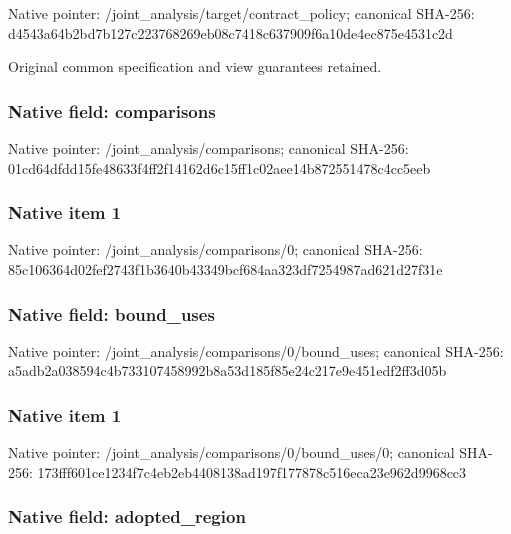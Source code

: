 \documentclass[10pt,a4paper]{article}
\begin{document}
Native pointer: /joint\_analysis/target/contract\_policy; canonical SHA-256: d4543a64b2bd7b127c223768\allowbreak{}269eb08c7418c637909f6a10\allowbreak{}de4ec875e4531c2d


Original common specification and view guarantees retained.


\subsubsection{Native field: comparisons}


Native pointer: /joint\_analysis/comparisons; canonical SHA-256: 01cd64dfdd15fe48633f4ff2\allowbreak{}f14162d6c15ff1c02aee14b8\allowbreak{}72551478c4cc5eeb



\subsubsection{Native item 1}


Native pointer: /joint\_analysis/comparisons/0; canonical SHA-256: 85c106364d02fef2743f1b36\allowbreak{}40b43349bcf684aa323df725\allowbreak{}4987ad621d27f31e



\subsubsection{Native field: bound\_uses}


Native pointer: /joint\_analysis/comparis\allowbreak{}ons/0/bound\_uses; canonical SHA-256: a5adb2a038594c4b73310745\allowbreak{}8992b8a53d185f85e24c217e\allowbreak{}9e451edf2ff3d05b



\subsubsection{Native item 1}


Native pointer: /joint\_analysis/comparis\allowbreak{}ons/0/bound\_uses/0; canonical SHA-256: 173fff601ce1234f7c4eb2eb\allowbreak{}4408138ad197f177878c516e\allowbreak{}ca23e962d9968cc3



\subsubsection{Native field: adopted\_region}
\end{document}
